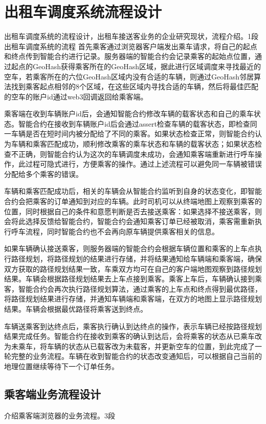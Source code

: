 \section{出租车调度系统流程设计}
出租车调度系统的流程设计，出租车接送客业务的企业研究现状，流程介绍。1段
出租车调度系统的流程
首先乘客通过浏览器客户端发出乘车请求，将自己的起点和终点传到智能合约进行记录。服务器端的智能合约会记录乘客的起始点位置，通过起点的GeoHash获得乘客所在的GeoHash区域，据此进行区域调度来寻找最近的空车，若乘客所在的六位GeoHash区域内没有合适的车辆，则通过GeoHash邻居算法找到乘客起点相邻的8个区域，在这些区域内寻找合适的车辆，然后将最佳匹配的空车的账户id通过web3回调返回给乘客端。

乘客端在收到车辆账户id后，会通知智能合约修改车辆的载客状态和自己的乘车状态。智能合约在接收到车辆账户id后会通过assert检查车辆的载客状态，即检查同一车辆是否在短时间内被分配给了不同的乘客。如果状态检查正常，则智能合约认为车辆和乘客匹配成功，顺利修改乘客的乘车状态和车辆的载客状态；如果状态检查不正确，则智能合约认为这次的车辆调度未成功，会通知乘客端重新进行呼车操作，此过程可隐式进行，方便乘客的操作。通过上述流程可以避免同一车辆被错误分配给多个乘客的错误。

车辆和乘客匹配成功后，相关的车辆会从智能合约监听到自身的状态变化，即智能合约会把乘客的订单通知到对应的车辆。此时司机可以从终端地图上观察到乘客的位置，同时根据自己的条件和意愿判断是否去接送乘客：如果选择不接送乘客，则会将此选择反馈给智能合约，智能合约会通知乘客订单已经被取消，乘客需重新执行呼车流程，同时智能合约也不会再向原车辆提供乘客相关的信息。

如果车辆确认接送乘客，则服务器端的智能合约会根据车辆位置和乘客的上车点执行路径规划，将路径规划的结果进行存储，并将结果通知给车辆端和乘客端，确保双方获取的路径规划结果一致，车乘双方均可在自己的客户端地图观察到路径规划结果。车辆会根据路径规划结果去上车点接到乘客。乘客上车后，车辆确认接到乘客，智能合约会再次执行路径规划算法，通过乘客的上车点和终点得到最优路径，将路径规划结果进行存储，并通知车辆端和乘客端，在双方的地图上显示路径规划结果。车辆会根据最优路径将乘客送到终点。

车辆送乘客到达终点后，乘客执行确认到达终点的操作，表示车辆已经按路径规划结果完成任务。智能合约在接收到乘客的确认到达后，会将乘客的状态从已乘车改为未乘车，将车辆的状态从已载客改为未载客，并更新空车的位置，到此完成了一轮完整的业务流程。车辆在收到智能合约的状态改变通知后，可以根据自己当前的地理位置继续等待下一个订单任务。

\subsection{乘客端业务流程设计}
介绍乘客端浏览器的业务流程。3段
